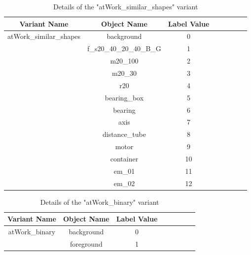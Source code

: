 \documentclass[paper=a4,11pt,parskip=half,toc=listof]{scrartcl}
\begin{document}
\begin{itemize}
		\begin{table}[!htb]
			\centering
			\begin{tabular}{|c|c|c|c|c|c|c|c|}
			\hline 
  			\textbf{Variant Name} & \textbf{Object Name} & \textbf{Label Value} \\ 
			\hline
			\multirow{13}{*}{atWork\_similar\_shapes} & background & 0 \\ 
			\cline{2-3}%
			 & f\_s20\_40\_20\_40\_B\_G & 1 \\
			\cline{2-3}
			& m20\_100 & 2 \\
			\cline{2-3} 
			& m20\_30 & 3 \\
			\cline{2-3} 
			& r20 & 4 \\
			\cline{2-3} 
			& bearing\_box & 5 \\
			\cline{2-3} 
			& bearing & 6 \\
			\cline{2-3} 
			& axis & 7 \\
			\cline{2-3} 
			& distance\_tube & 8 \\
			\cline{2-3} 
			& motor & 9 \\
			\cline{2-3} 
			& container & 10 \\
			\cline{2-3} 
			& em\_01 & 11 \\
			\cline{2-3} 
			& em\_02 & 12 \\
			\hline
			\end{tabular}
			\caption{Details of the "atWork\_similar\_shapes" variant} 
			\label{Table:shape}
		\end{table}
		
		\begin{table}[!htb]
			\centering
			\begin{tabular}{|c|c|c|c|c|c|c|c|}
			\hline 
  			\textbf{Variant Name} & \textbf{Object Name} & \textbf{Label Value} \\ 
			\hline
			\multirow{2}{*}{atWork\_binary} & background & 0 \\ 
			\cline{2-3}%
			 & foreground & 1 \\
			\hline
			\end{tabular}
			\caption{Details of the "atWork\_binary" variant} 
			\label{Table:binary}
		\end{table}

	\end{itemize}
\end{document}
